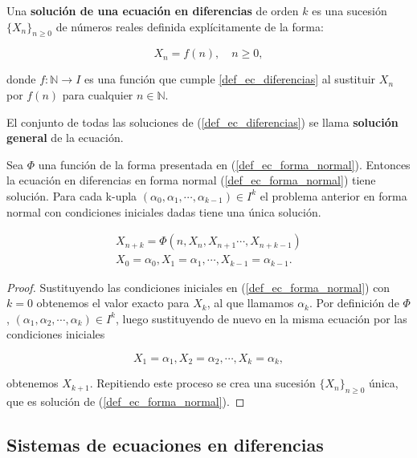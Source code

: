 \begin{definition}
Una \textbf{solución de una ecuación en diferencias} de orden $k$ es una sucesión $\{X_n\}_{n\geq 0}$ de números reales definida explícitamente de la forma:

$$X_n = f(n),\quad n\geq 0,$$

donde $f: \mathbb{N} \rightarrow I$ es una función que cumple \eqref{def_ec_diferencias} al sustituir $X_n$ por $f(n)$ para cualquier $n\in\mathbb{N}$.

El conjunto de todas las soluciones de (\ref{def_ec_diferencias}) se llama \textbf{solución general} de la ecuación.
\end{definition}

\begin{theorem}
Sea $\Phi$ una función de la forma presentada en (\ref{def_ec_forma_normal}). Entonces la ecuación en diferencias en forma normal (\ref{def_ec_forma_normal}) tiene solución.
Para cada k-upla $(\alpha_0, \alpha_1, \cdots ,\alpha_{k-1})\in I^{k}$ el problema anterior en forma normal con condiciones iniciales dadas tiene una única solución.

\begin{equation}
\begin{aligned}
X_{n+k} = \Phi (n, X_n, X_{n+1}\cdots , X_{n+k-1}) \\
X_0 = \alpha_0, X_1=\alpha_1, \cdots , X_{k-1}=\alpha_{k-1}.
\end {aligned}
\end{equation}

\end{theorem}
\begin{proof}
Sustituyendo las condiciones iniciales en (\ref{def_ec_forma_normal}) con $k=0$ obtenemos el valor exacto para $X_k$, al que llamamos $\alpha_k$. Por definición de $\Phi$, $(\alpha_1, \alpha_2, \cdots ,\alpha_{k})\in I^{k}$, luego sustituyendo de nuevo en la misma ecuación por las condiciones iniciales

$$X_1 = \alpha_1, X_2=\alpha_2, \cdots , X_{k}=\alpha_{k},$$

obtenemos $X_{k+1}$. Repitiendo este proceso se crea una sucesión $\{X_n\}_{n\geq 0}$ única, que es solución de (\ref{def_ec_forma_normal}).
\end{proof}


\subsection{Sistemas de ecuaciones en diferencias}

